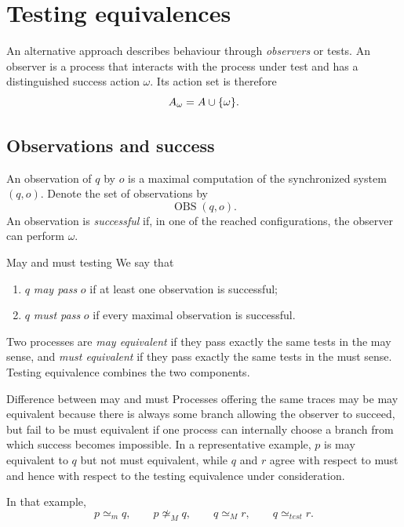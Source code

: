 \documentclass[a4paper]{article}
\newcommand{\OBS}{\operatorname{OBS}}
\begin{document}
\section{Testing equivalences}

An alternative approach describes behaviour through \emph{observers} or tests.
An observer is a process that interacts with the process under test and has a distinguished success action \(\omega\).
Its action set is therefore
\[
    A_\omega=A\cup\{\omega\}.
\]

\subsection{Observations and success}

An observation of \(q\) by \(o\) is a maximal computation of the synchronized system \((q,o)\).
Denote the set of observations by
\[
    \OBS(q,o).
\]
An observation is \emph{successful} if, in one of the reached configurations, the observer can perform \(\omega\).

\begin{snippetdefinition}{May and must testing}
    We say that
    \begin{enumerate}
        \item \(q\) \emph{may pass} \(o\) if at least one observation is successful;
        \item \(q\) \emph{must pass} \(o\) if every maximal observation is successful.
    \end{enumerate}
\end{snippetdefinition}

Two processes are \emph{may equivalent} if they pass exactly the same tests in the may sense, and \emph{must equivalent} if they pass exactly the same tests in the must sense.
Testing equivalence combines the two components.

\begin{snippetexample}{Difference between may and must}
    Processes offering the same traces may be may equivalent because there is always some branch allowing the observer to succeed, but fail to be must equivalent if one process can internally choose a branch from which success becomes impossible.
    In a representative example, \(p\) is may equivalent to \(q\) but not must equivalent, while \(q\) and \(r\) agree with respect to must and hence with respect to the testing equivalence under consideration.
\end{snippetexample}

In that example,
\[
    p\simeq_m q,
    \qquad
    p\not\simeq_M q,
    \qquad
    q\simeq_M r,
    \qquad
    q\simeq_{test}r.
\]
\end{document}
